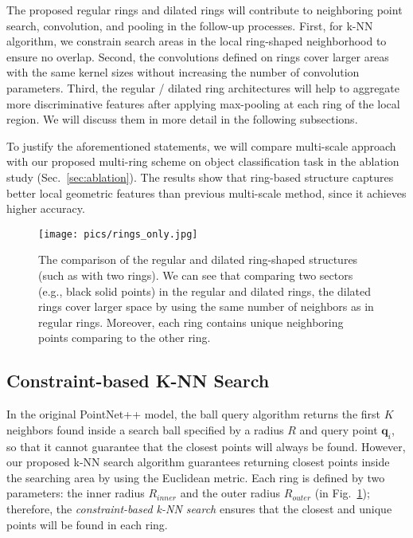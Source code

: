 \documentclass[10pt,twocolumn,letterpaper]{article}
\begin{document}
The proposed regular rings and dilated rings will contribute to neighboring point search, convolution, and pooling in the follow-up processes. First, for k-NN algorithm, we constrain search areas in the local ring-shaped neighborhood to ensure no overlap. Second, the convolutions defined on rings cover larger areas with the same kernel sizes without increasing the number of convolution parameters. Third, the regular / dilated ring architectures will help to aggregate more discriminative features after applying max-pooling at each ring of the local region. We will discuss them in more detail in the following subsections.

To justify the aforementioned statements, we will compare multi-scale approach with our proposed multi-ring scheme on object classification task in the ablation study (Sec.~\ref{sec:ablation}). The results show that ring-based structure captures better local geometric features than previous multi-scale method, since it achieves higher accuracy.
\begin{figure}[t]
\begin{center}
  \texttt{[image: pics/rings\_only.jpg]}\vspace{-4mm}
\end{center}
\caption{The comparison of the regular and dilated ring-shaped structures (such as with two rings). We can see that comparing two sectors (e.g., black solid points) in the regular and dilated rings, the dilated rings cover larger space by using the same number of neighbors as in regular rings. Moreover, each ring contains unique neighboring points comparing to the other ring.
}\vspace{-5mm}
\centering
\label{fig:dilated_rings}
\end{figure}

\subsection{Constraint-based K-NN Search}
In the original PointNet++ model, the ball query algorithm returns the first $K$ neighbors found inside a search ball specified by a radius $R$ and query point $\mathbf{q}_i$, so that it cannot guarantee that the closest points will always be found. However, our proposed k-NN search algorithm guarantees returning closest points inside the searching area by using the Euclidean metric. Each ring is defined by two parameters: the inner radius $R_{inner}$ and the outer radius $R_{outer}$ (in Fig.~\ref{fig:dilated_rings}); therefore, the \emph{constraint-based k-NN search} ensures that the closest and unique points will be found in each ring.
\vspace{-2mm}
\end{document}
